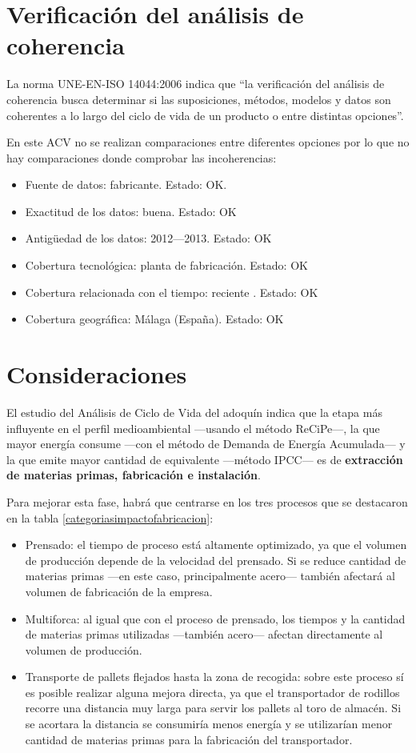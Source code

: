 \section{Verificación del análisis de coherencia}

La norma UNE-EN-ISO 14044:2006 indica que ``la verificación del análisis de coherencia busca determinar si las suposiciones, métodos, modelos y datos son coherentes a lo largo del ciclo de vida de un producto o entre distintas opciones''.

En este ACV no se realizan comparaciones entre diferentes opciones por lo que no hay comparaciones donde comprobar las incoherencias:

\begin{itemize}
  \item Fuente de datos: fabricante. Estado: OK.
  \item Exactitud de los datos: buena. Estado: OK
  \item Antigüedad de los datos: 2012—2013. Estado: OK
  \item Cobertura tecnológica: planta de fabricación. Estado: OK
  \item Cobertura relacionada con el tiempo: reciente . Estado: OK
  \item Cobertura geográfica: Málaga (España). Estado: OK
\end{itemize}

\section{Consideraciones}

El estudio del Análisis de Ciclo de Vida del adoquín indica que la etapa más influyente en el perfil medioambiental —usando el método ReCiPe—, la que mayor energía consume —con el método de Demanda de Energía Acumulada— y la que emite mayor cantidad de  equivalente —método IPCC— es de \textbf{extracción de materias primas, fabricación e instalación}.

Para mejorar esta fase, habrá que centrarse en los tres procesos que se destacaron en la tabla \ref{categoriasimpactofabricacion}:

\begin{itemize}
  \item Prensado: el tiempo de proceso está altamente optimizado, ya que el volumen de producción depende de la velocidad del prensado. Si se reduce cantidad de materias primas —en este caso, principalmente acero— también afectará al volumen de fabricación de la empresa.
  \item Multiforca: al igual que con el proceso de prensado, los tiempos y la cantidad de materias primas utilizadas —también acero— afectan directamente al volumen de producción.
  \item Transporte de pallets flejados hasta la zona de recogida: sobre este proceso sí es posible realizar alguna mejora directa, ya que el transportador de rodillos recorre una distancia muy larga para servir los pallets al toro de almacén. Si se acortara la distancia se consumiría menos energía y se utilizarían menor cantidad de materias primas para la fabricación del transportador.
\end{itemize}

